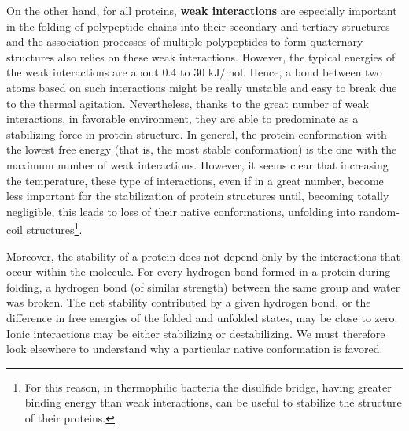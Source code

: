 On the other hand, for all proteins, \textbf{weak interactions} are especially important in the folding of polypeptide chains into their secondary and tertiary structures and the association processes of multiple polypeptides to form quaternary structures also relies on these weak interactions. However, the typical energies of the weak interactions are about 0.4 to 30 kJ$/$mol. Hence, a bond between two atoms based on such interactions might be really unstable and easy to break due to the thermal agitation.
Nevertheless, thanks to the great number of weak interactions, in favorable environment, they are able to predominate as a stabilizing force in protein structure. In general, the protein conformation with the lowest free energy (that is, the most stable conformation) is the one with the maximum number of weak interactions. However, it seems clear that increasing the temperature, these type of interactions, even if in a great number, become less important for the stabilization of protein structures until, becoming totally negligible, this leads to loss of their native conformations, unfolding into random-coil structures\footnote{For this reason, in thermophilic bacteria the disulfide bridge, having greater binding energy than weak interactions, can be useful to stabilize the structure of their proteins.}.

Moreover, the stability of a protein does not depend only by the interactions that occur within the molecule. For every hydrogen bond formed in a protein during folding, a hydrogen bond (of similar strength) between the same group and water was broken. The net stability contributed by a given hydrogen bond, or the difference in free energies of the folded and unfolded states, may be close to zero. Ionic interactions may be either stabilizing or destabilizing. We must therefore look elsewhere to understand why a particular native conformation is favored. 

